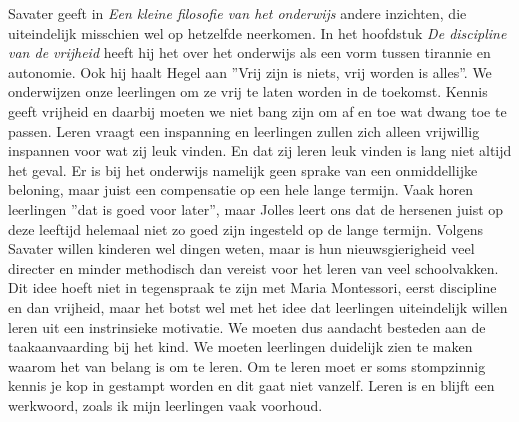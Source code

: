 \documentclass[12pt, a4paper]{article}
\begin{document}
Savater \cite[]{savater} geeft in \emph{Een kleine filosofie van het onderwijs} andere inzichten, die uiteindelijk misschien wel op hetzelfde neerkomen. In het hoofdstuk \emph{De discipline van de vrijheid} heeft hij het over het onderwijs als een vorm tussen tirannie en autonomie. Ook hij haalt Hegel aan ''Vrij zijn is niets, vrij worden is alles''. We onderwijzen onze leerlingen om ze vrij te laten worden in de toekomst. Kennis geeft vrijheid en daarbij moeten we niet bang zijn om af en toe wat dwang toe te passen. Leren vraagt een inspanning en leerlingen zullen zich alleen vrijwillig inspannen voor wat zij leuk vinden. En dat zij leren leuk vinden is lang niet altijd het geval. Er is bij het onderwijs namelijk geen sprake van een onmiddellijke beloning, maar juist een compensatie op een hele lange termijn. Vaak horen leerlingen ''dat is goed voor later'', maar Jolles \cite{jolles}
leert ons dat de hersenen juist op deze leeftijd helemaal niet zo goed zijn ingesteld op de lange termijn. Volgens Savater willen kinderen wel dingen weten, maar is hun nieuwsgierigheid veel directer en minder methodisch dan vereist voor het leren van veel schoolvakken. \cite[pp. 84-89]{savater}
Dit idee hoeft niet in tegenspraak te zijn met Maria Montessori, eerst discipline en dan vrijheid, maar het botst wel met het idee dat leerlingen uiteindelijk willen leren uit een instrinsieke motivatie. We moeten dus aandacht besteden aan de taakaanvaarding bij het kind. We moeten leerlingen duidelijk zien te maken waarom het van belang is om te leren. Om te leren moet er soms stompzinnig kennis je kop in gestampt worden en dit gaat niet vanzelf. Leren is en blijft een werkwoord, zoals ik mijn leerlingen vaak voorhoud.
\end{document}
